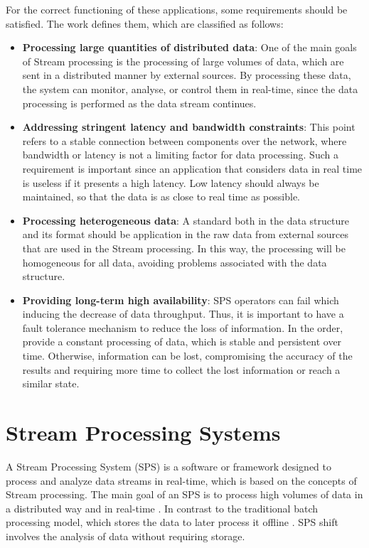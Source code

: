 For the correct functioning of these applications, some requirements should be satisfied. The work \cite{andrade2014fundamentals} defines them, which are classified as follows:

\begin{itemize}
	\item \textbf{Processing large quantities of distributed data}: One of the main goals of Stream processing is the processing of large volumes of data, which are sent in a distributed manner by external sources. By processing these data, the system can monitor, analyse, or control them in real-time, since the data processing is performed as the data stream continues.
	\item \textbf{Addressing stringent latency and bandwidth constraints}: This point refers to a stable connection between components over the network, where bandwidth or latency is not a limiting factor for data processing. Such a requirement is important since an application that considers data in real time is useless if it presents a high latency. Low latency should always be maintained, so that the data is as close to real time as possible.
	\item \textbf{Processing heterogeneous data}: A standard both in the data structure and its format should be application in the raw data from external sources that are used in the Stream processing. In this way, the processing will be homogeneous for all data, avoiding problems associated with the data structure.
	\item \textbf{Providing long-term high availability}: SPS operators can fail which inducing the decrease of data throughput. Thus, it is important to have a fault tolerance mechanism to reduce the loss of information. In the order, provide a constant processing of data, which is stable and persistent over time. Otherwise, information can be lost, compromising the accuracy of the results and requiring more time to collect the lost information or reach a similar state.
\end{itemize}

\section{Stream Processing Systems}
A Stream Processing System (SPS) is a software or framework designed to process and analyze data streams in real-time, which is based on the concepts of Stream processing. The main goal of an SPS is to process high volumes of data in a distributed way and in real-time \cite{kleppmann2016making}. In contrast to the traditional batch processing model, which stores the data to later process it offline \cite{HawwashN14}. SPS shift involves the analysis of data without requiring storage.

